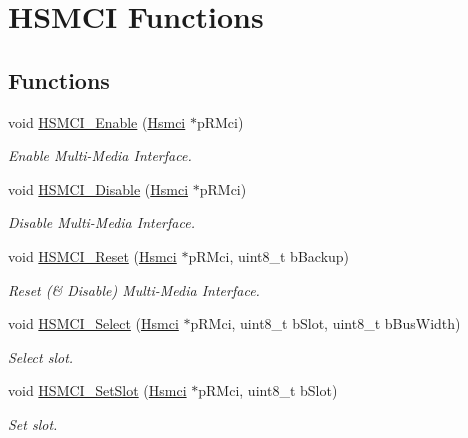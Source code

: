 \hypertarget{group__hsmci__functions}{}\section{H\+S\+M\+CI Functions}
\label{group__hsmci__functions}
\subsection*{Functions}
\begin{DoxyCompactItemize}
\item 
void \mbox{\hyperlink{group__hsmci__functions_ga2c391b7420eb0660c30b87510a862770}{H\+S\+M\+C\+I\+\_\+\+Enable}} (\mbox{\hyperlink{structHsmci}{Hsmci}} $\ast$p\+R\+Mci)
\begin{DoxyCompactList}\small\item\em Enable Multi-\/\+Media Interface. \end{DoxyCompactList}\item 
void \mbox{\hyperlink{group__hsmci__functions_ga2c89bafa247d5b403603f9ecd26cbff7}{H\+S\+M\+C\+I\+\_\+\+Disable}} (\mbox{\hyperlink{structHsmci}{Hsmci}} $\ast$p\+R\+Mci)
\begin{DoxyCompactList}\small\item\em Disable Multi-\/\+Media Interface. \end{DoxyCompactList}\item 
void \mbox{\hyperlink{group__hsmci__functions_ga0f8d0807a99a07f6d859633b77d062b2}{H\+S\+M\+C\+I\+\_\+\+Reset}} (\mbox{\hyperlink{structHsmci}{Hsmci}} $\ast$p\+R\+Mci, uint8\+\_\+t b\+Backup)
\begin{DoxyCompactList}\small\item\em Reset (\& Disable) Multi-\/\+Media Interface. \end{DoxyCompactList}\item 
void \mbox{\hyperlink{group__hsmci__functions_ga210fc8e5e44462ef886fcccda3d2fec9}{H\+S\+M\+C\+I\+\_\+\+Select}} (\mbox{\hyperlink{structHsmci}{Hsmci}} $\ast$p\+R\+Mci, uint8\+\_\+t b\+Slot, uint8\+\_\+t b\+Bus\+Width)
\begin{DoxyCompactList}\small\item\em Select slot. \end{DoxyCompactList}\item 
void \mbox{\hyperlink{group__hsmci__functions_gaa994954a36c86927aa59db8b8737c47f}{H\+S\+M\+C\+I\+\_\+\+Set\+Slot}} (\mbox{\hyperlink{structHsmci}{Hsmci}} $\ast$p\+R\+Mci, uint8\+\_\+t b\+Slot)
\begin{DoxyCompactList}\small\item\em Set slot. \end{DoxyCompactList}\item 

\end{DoxyCompactItemize}
